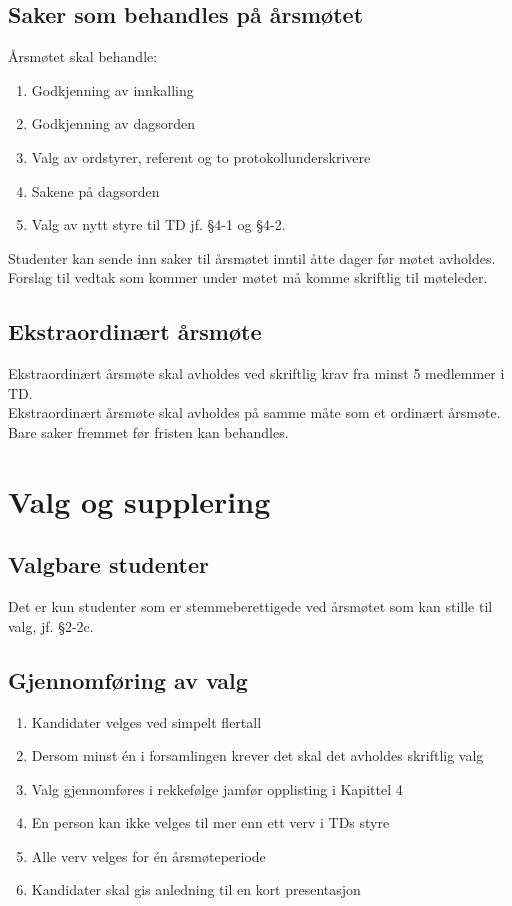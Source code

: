 \documentclass[11pt]{article}
\begin{document}
\subsection{Saker som behandles på årsmøtet}
Årsmøtet skal behandle:
\begin{enumerate}
	\item Godkjenning av innkalling
	\item Godkjenning av dagsorden
	\item Valg av ordstyrer, referent og to protokollunderskrivere
	\item Sakene på dagsorden
	\item Valg av nytt styre til TD jf. §4-1 og §4-2. 
\end{enumerate}
Studenter kan sende inn saker til årsmøtet inntil åtte dager før møtet avholdes. Forslag til vedtak som kommer under møtet må komme skriftlig til møteleder.

\subsection{Ekstraordinært årsmøte}
Ekstraordinært årsmøte skal avholdes ved skriftlig krav fra minst 5 medlemmer i TD.\\
Ekstraordinært årsmøte skal avholdes på samme måte som et ordinært årsmøte. Bare saker fremmet før fristen kan behandles. 

\section{Valg og supplering}
\subsection{Valgbare studenter}
Det er kun studenter som er stemmeberettigede ved årsmøtet som kan stille til valg, jf. §2-2c.

\subsection{Gjennomføring av valg}
\begin{enumerate}
	\item Kandidater velges ved simpelt flertall
	\item Dersom minst én i forsamlingen krever det skal det avholdes skriftlig valg
	\item Valg gjennomføres i rekkefølge jamfør opplisting i Kapittel 4
	\item En person kan ikke velges til mer enn ett verv i TDs styre
	\item Alle verv velges for én årsmøteperiode
	\item Kandidater skal gis anledning til en kort presentasjon
\end{enumerate}
\end{document}
